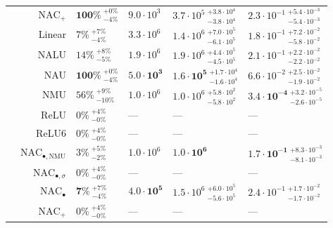 \begin{longtable}{crllll}
\nopagebreak
 & $\mathrm{NAC}_{+}$ & $\mathbf{100\%} {~}^{+0\%}_{-4\%}$ & $9.0 \cdot 10^{3}$ & $3.7 \cdot 10^{5} {~}^{+3.8 \cdot 10^{4}}_{-3.8 \cdot 10^{4}}$ & $2.3 \cdot 10^{-1} {~}^{+5.4 \cdot 10^{-3}}_{-5.4 \cdot 10^{-3}}$\\

\nopagebreak
 & Linear & $7\% {~}^{+7\%}_{-4\%}$ & $3.3 \cdot 10^{6}$ & $1.4 \cdot 10^{6} {~}^{+7.0 \cdot 10^{5}}_{-6.1 \cdot 10^{5}}$ & $1.8 \cdot 10^{-1} {~}^{+7.2 \cdot 10^{-2}}_{-5.8 \cdot 10^{-2}}$\\

\nopagebreak
 & NALU & $14\% {~}^{+8\%}_{-5\%}$ & $1.9 \cdot 10^{6}$ & $1.9 \cdot 10^{6} {~}^{+4.4 \cdot 10^{5}}_{-4.5 \cdot 10^{5}}$ & $2.1 \cdot 10^{-1} {~}^{+2.2 \cdot 10^{-2}}_{-2.2 \cdot 10^{-2}}$\\

\nopagebreak
 & NAU & $\mathbf{100\%} {~}^{+0\%}_{-4\%}$ & $\mathbf{5.0 \cdot 10^{3}}$ & $\mathbf{1.6 \cdot 10^{5}} {~}^{+1.7 \cdot 10^{4}}_{-1.6 \cdot 10^{4}}$ & $6.6 \cdot 10^{-2} {~}^{+2.5 \cdot 10^{-2}}_{-1.9 \cdot 10^{-2}}$\\

\nopagebreak
 & NMU & $56\% {~}^{+9\%}_{-10\%}$ & $1.0 \cdot 10^{6}$ & $1.0 \cdot 10^{6} {~}^{+5.8 \cdot 10^{2}}_{-5.8 \cdot 10^{2}}$ & $\mathbf{3.4 \cdot 10^{-4}} {~}^{+3.2 \cdot 10^{-5}}_{-2.6 \cdot 10^{-5}}$\\

\nopagebreak
 & ReLU & $0\% {~}^{+4\%}_{-0\%}$ & --- & --- & ---\\

\nopagebreak
\multirow{-10}{*}{\centering\arraybackslash $\bm{-}$} & ReLU6 & $0\% {~}^{+4\%}_{-0\%}$ & --- & --- & ---\\
\cmidrule{1-6}
 & $\mathrm{NAC}_{\bullet,\mathrm{NMU}}$ & $3\% {~}^{+5\%}_{-2\%}$ & $1.0 \cdot 10^{6}$ & $\mathbf{1.0 \cdot 10^{6}}$ & $\mathbf{1.7 \cdot 10^{-1}} {~}^{+8.3 \cdot 10^{-3}}_{-8.1 \cdot 10^{-3}}$\\

\nopagebreak
 & $\mathrm{NAC}_{\bullet,\sigma}$ & $0\% {~}^{+4\%}_{-0\%}$ & --- & --- & ---\\

\nopagebreak
 & $\mathrm{NAC}_{\bullet}$ & $\mathbf{7\%} {~}^{+7\%}_{-4\%}$ & $\mathbf{4.0 \cdot 10^{5}}$ & $1.5 \cdot 10^{6} {~}^{+6.0 \cdot 10^{5}}_{-5.6 \cdot 10^{5}}$ & $2.4 \cdot 10^{-1} {~}^{+1.7 \cdot 10^{-2}}_{-1.7 \cdot 10^{-2}}$\\

\nopagebreak
 & $\mathrm{NAC}_{+}$ & $0\% {~}^{+4\%}_{-0\%}$ & --- & --- & ---\\


\end{longtable}
